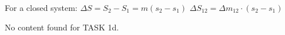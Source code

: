 For a closed system:  
\( \Delta S = S_2 - S_1 = m (s_2 - s_1) \)  
\( \Delta S_{12} = \Delta m_{12} \cdot (s_2 - s_1) \)  

No content found for TASK 1d.